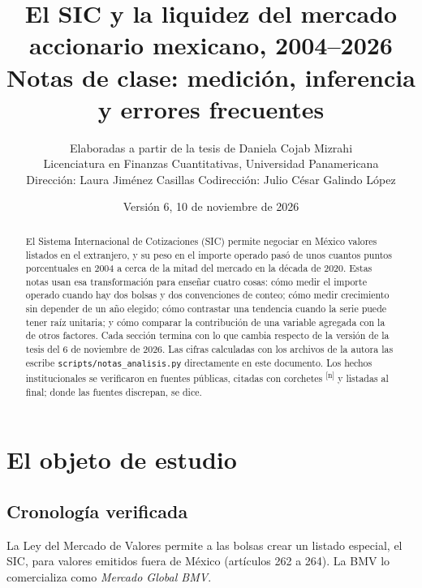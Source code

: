 \documentclass[11pt,letterpaper]{article}
\title{El SIC y la liquidez del mercado accionario mexicano, 2004--2026\\[3pt]
\large Notas de clase: medición, inferencia y errores frecuentes}
\author{Elaboradas a partir de la tesis de Daniela Cojab Mizrahi\\
\small Licenciatura en Finanzas Cuantitativas, Universidad Panamericana\\
\small Dirección: Laura Jiménez Casillas \quad Codirección: Julio César Galindo López}
\date{Versión 6, 10 de noviembre de 2026}
\theoremstyle{definition}
\theoremstyle{plain}
\newcommand{\web}[1]{\textsuperscript{[#1]}}
\begin{document}
\maketitle

\begin{abstract}
\noindent El Sistema Internacional de Cotizaciones (SIC) permite negociar en México valores listados en el extranjero, y su peso en el importe operado pasó de unos cuantos puntos porcentuales en 2004 a cerca de la mitad del mercado en la década de 2020. Estas notas usan esa transformación para enseñar cuatro cosas: cómo medir el importe operado cuando hay dos bolsas y dos convenciones de conteo; cómo medir crecimiento sin depender de un año elegido; cómo contrastar una tendencia cuando la serie puede tener raíz unitaria; y cómo comparar la contribución de una variable agregada con la de otros factores. Cada sección termina con lo que cambia respecto de la versión de la tesis del 6 de noviembre de 2026. Las cifras calculadas con los archivos de la autora las escribe \texttt{scripts/notas\_analisis.py} directamente en este documento. Los hechos institucionales se verificaron en fuentes públicas, citadas con corchetes \web{n} y listadas al final; donde las fuentes discrepan, se dice.
\end{abstract}

\tableofcontents

\section{El objeto de estudio}

\subsection{Cronología verificada}
La Ley del Mercado de Valores permite a las bolsas crear un listado especial, el SIC, para valores emitidos fuera de México (artículos 262 a 264). La BMV lo comercializa como \emph{Mercado Global BMV}.
\end{document}
